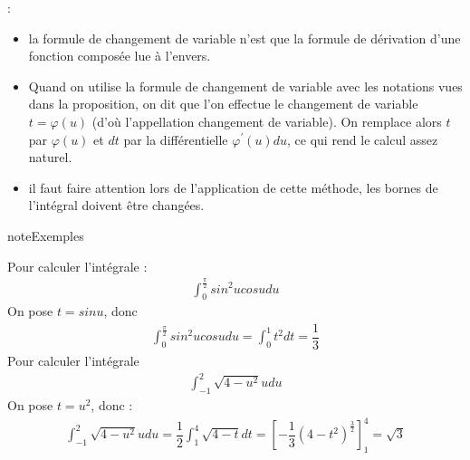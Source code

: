 \documentclass[letterpaper,10pt,french]{sphinxmanual}
\begin{document}
\sphinxAtStartPar
{}:
\begin{itemize}
\item {} 
\sphinxAtStartPar
la formule de changement de variable n’est que la formule de dérivation d’une fonction composée lue à l’envers.

\item {} 
\sphinxAtStartPar
Quand on utilise la formule de changement de variable avec les notations vues dans la proposition, on dit que l’on effectue le changement de variable \(t=\varphi(u)\) (d’où l’appellation changement de variable). On remplace alors \(t\) par \(\varphi(u)\) et \(dt\) par la différentielle \(\varphi^{'}(u)du\), ce qui rend le calcul assez naturel.

\item {} 
\sphinxAtStartPar
il faut faire attention lors de l’application de cette méthode, les bornes de l’intégral doivent être changées.

\end{itemize}

\begin{sphinxadmonition}{note}{Exemples}

\sphinxhyphen{} Pour calculer l’intégrale :
\begin{equation*}
\begin{split}
\int_0^{\frac{\pi}{2}} sin^2 u cos u du
\end{split}
\end{equation*}
\sphinxAtStartPar
On pose \(t = sin u\), donc
\begin{equation*}
\begin{split}
\int_0^{\frac{\pi}{2}} sin^2 u cos u du = \int_0^{1} t^2 dt = \dfrac{1}{3}
\end{split}
\end{equation*}
\sphinxhyphen{} Pour calculer l’intégrale
\begin{equation*}
\begin{split}
\int_{-1}^2 \sqrt{4-u^2} u du
\end{split}
\end{equation*}
\sphinxAtStartPar
On pose \(t = u^2\), donc :
\begin{equation*}
\begin{split}
\int_{-1}^2 \sqrt{4-u^2} u du = \dfrac{1}{2}\int_1^4 \sqrt{4-t}dt = [-\dfrac{1}{3}(4-t^2)^{\frac{3}{2}}]_1^4 = \sqrt{3}
\end{split}
\end{equation*}\end{sphinxadmonition}
\end{document}
